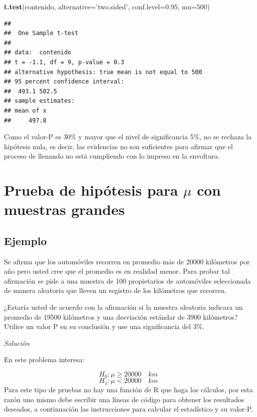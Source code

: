 \documentclass[10pt,]{krantz}
\makeatletter
\newenvironment{Shaded}{\begin{snugshade}}{\end{snugshade}}
\newcommand{\KeywordTok}[1]{\textcolor[rgb]{0.13,0.29,0.53}{\textbf{#1}}}
\newcommand{\DataTypeTok}[1]{\textcolor[rgb]{0.13,0.29,0.53}{#1}}
\newcommand{\DecValTok}[1]{\textcolor[rgb]{0.00,0.00,0.81}{#1}}
\newcommand{\FloatTok}[1]{\textcolor[rgb]{0.00,0.00,0.81}{#1}}
\newcommand{\StringTok}[1]{\textcolor[rgb]{0.31,0.60,0.02}{#1}}
\newcommand{\NormalTok}[1]{#1}
\let\proglang=\textsf
\newenvironment{kframe}{%
\medskip{}
\setlength{\fboxsep}{.8em}
 \def\at@end@of@kframe{}%
 \ifinner\ifhmode%
  \def\at@end@of@kframe{\end{minipage}}%
  \begin{minipage}{\columnwidth}%
 \fi\fi%
 \def\FrameCommand##1{\hskip\@totalleftmargin \hskip-\fboxsep
 \colorbox{shadecolor}{##1}\hskip-\fboxsep
     \hskip-\linewidth \hskip-\@totalleftmargin \hskip\columnwidth}%
 \MakeFramed {\advance\hsize-\width
   \@totalleftmargin\z@ \linewidth\hsize
   \@setminipage}}%
 {\par\unskip\endMakeFramed%
 \at@end@of@kframe}
\renewenvironment{Shaded}{\begin{kframe}}{\end{kframe}}
\makeatother
\begin{document}
\begin{Shaded}
\begin{Highlighting}[]
\KeywordTok{t.test}\NormalTok{(contenido, }\DataTypeTok{alternative=}\StringTok{'two.sided'}\NormalTok{,}
       \DataTypeTok{conf.level=}\FloatTok{0.95}\NormalTok{, }\DataTypeTok{mu=}\DecValTok{500}\NormalTok{)}
\end{Highlighting}
\end{Shaded}

\begin{verbatim}
## 
##  One Sample t-test
## 
## data:  contenido
## t = -1.1, df = 9, p-value = 0.3
## alternative hypothesis: true mean is not equal to 500
## 95 percent confidence interval:
##  493.1 502.5
## sample estimates:
## mean of x 
##     497.8
\end{verbatim}

Como el valor-P es 30\% y mayor que el nivel de significancia 5\%, no se
rechaza la hipótesis nula, es decir, las evidencias no son suficientes
para afirmar que el proceso de llenando no está cumpliendo con lo
impreso en la envoltura.

\section{\texorpdfstring{Prueba de hipótesis para \(\mu\) con muestras
grandes}{Prueba de hipótesis para \textbackslash{}mu con muestras grandes}}\label{prueba-de-hipotesis-para-mu-con-muestras-grandes}

\subsection*{Ejemplo}\label{ejemplo-63}


Se afirma que los automóviles recorren en promedio más de 20000
kilómetros por año pero usted cree que el promedio es en realidad menor.
Para probar tal afirmación se pide a una muestra de 100 propietarios de
automóviles seleccionada de manera aleatoria que lleven un registro de
los kilómetros que recorren.

¿Estaría usted de acuerdo con la afirmación si la muestra aleatoria
indicara un promedio de 19500 kilómetros y una desviación estándar de
3900 kilómetros? Utilice un valor P en su conclusión y use una
significancia del 3\%.

\emph{Solución}

En este problema interesa:

\[H_0: \mu \ge 20000 \quad km\] \[H_1: \mu < 20000 \quad km\] Para este
tipo de pruebas no hay una función de \proglang{R} que haga los
cálculos, por esta razón uno mismo debe escribir una líneas de código
para obtener los resultados deseados, a continuación las instrucciones
para calcular el estadístico y su valor-P.
\end{document}
